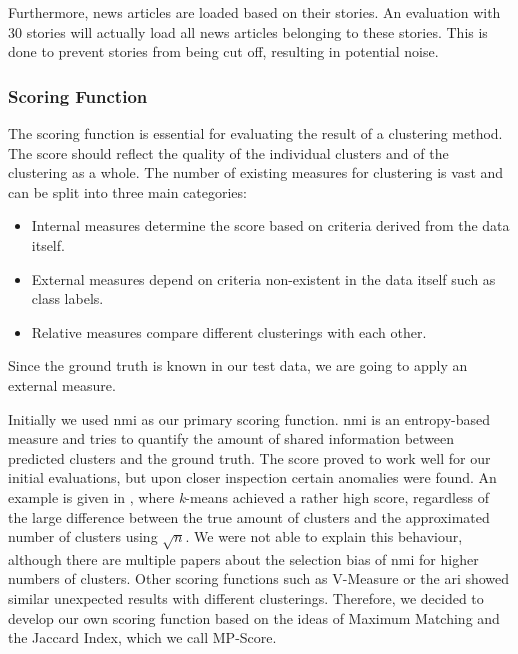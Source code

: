 Furthermore, news articles are loaded based on their stories. 
An evaluation with 30 stories will actually load all news articles belonging to these stories.
This is done to prevent stories from being cut off, resulting in potential noise.

\subsubsection{Scoring Function}
\label{subsubsec:4b_scoring_function}

The scoring function is essential for evaluating the result of a clustering method.
The score should reflect the quality of the individual clusters and of the clustering as a whole.
The number of existing measures for clustering is vast and can be split into three main categories:

\begin{itemize}
    \item Internal measures determine the score based on criteria derived from the data itself.
    \item External measures depend on criteria non-existent in the data itself such as class labels.
    \item Relative measures compare different clusterings with each other.
\end{itemize}

Since the ground truth is known in our test data, we are going to apply an external measure.

Initially we used \gls{nmi} as our primary scoring function.
\gls{nmi} is an entropy-based measure and tries to quantify the amount of shared information between predicted clusters and the ground truth.
The score proved to work well for our initial evaluations, but upon closer inspection certain anomalies were found.
An example is given in , where \textit{k}-means achieved a rather high score,
regardless of the large difference between the true amount of clusters and the approximated number of clusters using $\sqrt{n}$.
We were not able to explain this behaviour, although there are multiple papers
about the selection bias of \gls{nmi} for higher numbers of clusters\cite{LEI201758, clustering_anmi}.
Other scoring functions such as V-Measure or the \gls{ari} showed similar unexpected results with different clusterings.
Therefore, we decided to develop our own scoring function based on the ideas of Maximum Matching\cite{data_mining}
and the Jaccard Index, which we call MP-Score.

